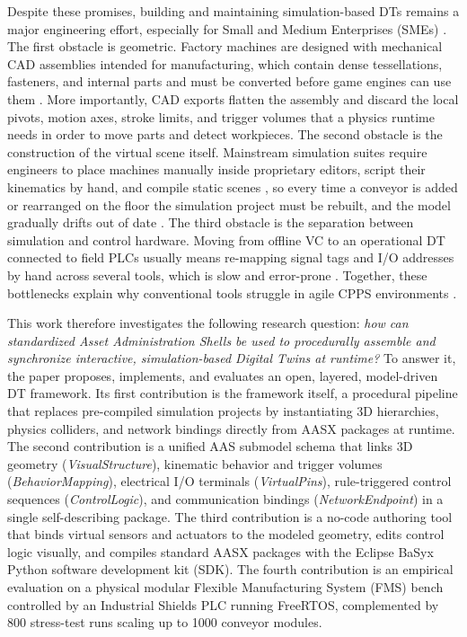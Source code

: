 \documentclass{ieeeojies}
\begin{document}
Despite these promises, building and maintaining simulation-based DTs remains a major engineering effort, especially for Small and Medium Enterprises (SMEs) \cite{Gil2024}. The first obstacle is geometric. Factory machines are designed with mechanical CAD assemblies intended for manufacturing, which contain dense tessellations, fasteners, and internal parts and must be converted before game engines can use them \cite{Chowdhury2025}. More importantly, CAD exports flatten the assembly and discard the local pivots, motion axes, stroke limits, and trigger volumes that a physics runtime needs in order to move parts and detect workpieces. The second obstacle is the construction of the virtual scene itself. Mainstream simulation suites require engineers to place machines manually inside proprietary editors, script their kinematics by hand, and compile static scenes \cite{Striffler2023}, so every time a conveyor is added or rearranged on the floor the simulation project must be rebuilt, and the model gradually drifts out of date \cite{Alexopoulos2025}. The third obstacle is the separation between simulation and control hardware. Moving from offline VC to an operational DT connected to field PLCs usually means re-mapping signal tags and I/O addresses by hand across several tools, which is slow and error-prone \cite{Luder2020,Gollner2022}. Together, these bottlenecks explain why conventional tools struggle in agile CPPS environments \cite{Rocha2024}.

This work therefore investigates the following research question: \textit{how can standardized Asset Administration Shells be used to procedurally assemble and synchronize interactive, simulation-based Digital Twins at runtime?} To answer it, the paper proposes, implements, and evaluates an open, layered, model-driven DT framework. Its first contribution is the framework itself, a procedural pipeline that replaces pre-compiled simulation projects by instantiating 3D hierarchies, physics colliders, and network bindings directly from AASX packages at runtime. The second contribution is a unified AAS submodel schema that links 3D geometry (\textit{VisualStructure}), kinematic behavior and trigger volumes (\textit{BehaviorMapping}), electrical I/O terminals (\textit{VirtualPins}), rule-triggered control sequences (\textit{ControlLogic}), and communication bindings (\textit{NetworkEndpoint}) in a single self-describing package. The third contribution is a no-code authoring tool that binds virtual sensors and actuators to the modeled geometry, edits control logic visually, and compiles standard AASX packages with the Eclipse BaSyx Python software development kit (SDK). The fourth contribution is an empirical evaluation on a physical modular Flexible Manufacturing System (FMS) bench controlled by an Industrial Shields PLC running FreeRTOS, complemented by 800 stress-test runs scaling up to 1000 conveyor modules.
\end{document}
